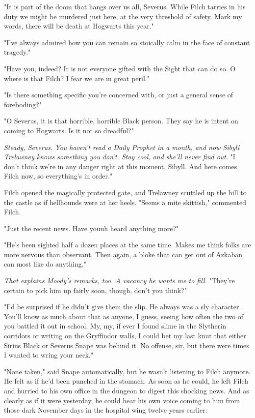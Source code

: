 "It is part of the doom that hangs over us all, Severus. While Filch tarries in his duty we might be murdered just here, at the very threshold of safety. Mark my words, there will be death at Hogwarts this year."

"I've always admired how you can remain so stoically calm in the face of constant tragedy."

"Have you, indeed? It is not everyone gifted with the Sight that can do so. O where is that Filch? I fear we are in great peril."

"Is there something specific you're concerned with, or just a general sense of foreboding?"

"O Severus, it is that horrible, horrible Black person. They say he is intent on coming to Hogwarts. Is it not so dreadful?"

\emph{Steady, Severus. You haven't read a Daily Prophet in a month, and now Sibyll Trelawney knows something you don't. Stay cool, and she'll never find out}. "I don't think we're in any danger right at this moment, Sibyll. And here comes Filch now, so everything's in order."

Filch opened the magically protected gate, and Trelawney scuttled up the hill to the castle as if hellhounds were at her heels. "Seems a mite skittish," commented Filch.

"Just the recent news. Have you{\el}uh{\el} heard anything more?"

"He's been sighted half a dozen places at the same time. Makes me think folks are more nervous than observant. Then again, a bloke that can get out of Azkaban can most like do anything."

\emph{That explains Moody's remarks, too. A vacancy he wants me to fill.} "They're certain to pick him up fairly soon, though, don't you think?"

"I'd be surprised if he didn't give them the slip. He always was a sly character. You'll know as much about that as anyone, I guess, seeing how often the two of you battled it out in school. My, my, if ever I found slime in the Slytherin corridors or writing on the Gryffindor walls, I could bet my last knut that either Sirius Black or Severus Snape was behind it. No offense, sir, but there were times I wanted to wring your neck."

"None taken," said Snape automatically, but he wasn't listening to Filch anymore. He felt as if he'd been punched in the stomach. As soon as he could, he left Filch and hurried to his own office in the dungeon to digest this shocking news. And as clearly as if it were yesterday, he could hear his own voice coming to him from those dark November days in the hospital wing twelve years earlier:

